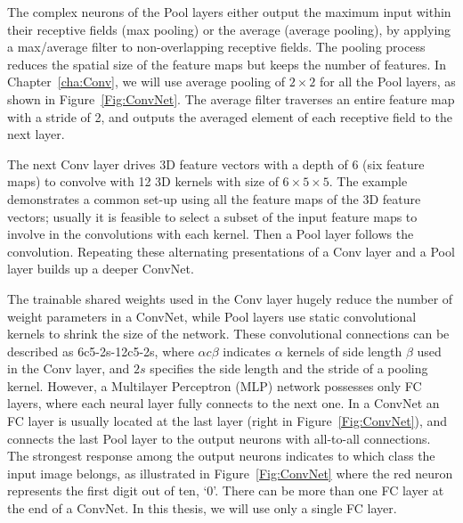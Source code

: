 The complex neurons of the Pool layers either output the maximum input within their receptive fields (max pooling) or the average (average pooling), by applying a max/average filter to non-overlapping receptive fields.
The pooling process reduces the spatial size of the feature maps but keeps the number of features.
In Chapter~\ref{cha:Conv}, we will use average pooling of $2\times2$ for all the Pool layers, as shown in Figure~\ref{Fig:ConvNet}.
The average filter traverses an entire feature map with a stride of 2, and outputs the averaged element of each receptive field to the next layer.

The next Conv layer drives 3D feature vectors with a depth of 6 (six feature maps) to convolve with 12 3D kernels with size of $6\times5\times5$.
The example demonstrates a common set-up using all the feature maps of the 3D feature vectors; usually it is feasible to select a subset of the input feature maps to involve in the convolutions with each kernel.
Then a Pool layer follows the convolution.
Repeating these alternating presentations of a Conv layer and a Pool layer builds up a deeper ConvNet.

The trainable shared weights used in the Conv layer hugely reduce the number of weight parameters in a ConvNet, while Pool layers use static convolutional kernels to shrink the size of the network.
These convolutional connections can be described as 6c5-2s-12c5-2s, where $\alpha c \beta$ indicates $\alpha$ kernels of side length $\beta$ used in the Conv layer, and $2s$ specifies the side length and the stride of a pooling kernel.
However, a Multilayer Perceptron (MLP) network possesses only FC layers, where each neural layer fully connects to the next one.
In a ConvNet an FC layer is usually located at the last layer (right in Figure~\ref{Fig:ConvNet}), and connects the last Pool layer to the output neurons with all-to-all connections.
The strongest response among the output neurons indicates to which class the input image belongs, as illustrated in Figure~\ref{Fig:ConvNet} where the red neuron represents the first digit out of ten, `0'.
There can be more than one FC layer at the end of a ConvNet.
In this thesis, we will use only a single FC layer.



